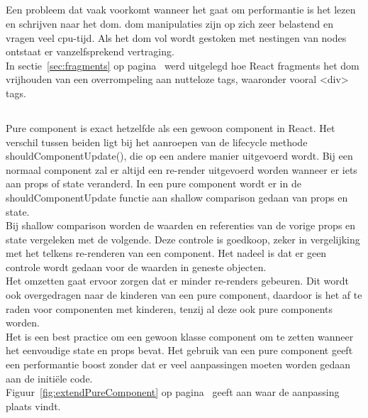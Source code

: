 \subsection{}
\label{sec:fragmentsPraktisch}

Een probleem dat vaak voorkomt wanneer het gaat om performantie is het lezen en schrijven naar het \gls{dom}. \gls{dom} manipulaties zijn op zich zeer belastend en vragen veel \gls{cpu}-tijd. Als het \gls{dom} vol wordt gestoken met nestingen van nodes ontstaat er vanzelfsprekend vertraging.\\
In sectie~\ref{sec:fragments} op pagina~\pageref{sec:fragments} werd uitgelegd hoe React fragments het \gls{dom} vrijhouden van een overrompeling aan nutteloze tags, waaronder vooral <div> tags.

\subsection{}
\label{sec:pureComponent}

Pure component is exact hetzelfde als een gewoon component in React. Het verschil tussen beiden ligt bij het aanroepen van de lifecycle methode shouldComponentUpdate(), die op een andere manier uitgevoerd wordt. Bij een normaal component zal er altijd een re-render uitgevoerd worden wanneer er iets aan props of state veranderd. In een pure component wordt er in de shouldComponentUpdate functie aan shallow comparison gedaan van props en state.\\
Bij shallow comparison worden de waarden en referenties van de vorige props en state vergeleken met de volgende. Deze controle is goedkoop, zeker in vergelijking met het telkens re-renderen van een component. Het nadeel is dat er geen controle wordt gedaan voor de waarden in geneste objecten. \\
Het omzetten gaat ervoor zorgen dat er minder re-renders gebeuren. Dit wordt ook overgedragen naar de kinderen van een pure component, daardoor is het af te raden voor componenten met kinderen, tenzij al deze ook pure components worden.\\
Het is een best practice om een gewoon klasse component om te zetten wanneer het eenvoudige state en props bevat. Het gebruik van een pure component geeft een performantie boost zonder dat er veel aanpassingen moeten worden gedaan aan de initiële code.\\
Figuur~\ref{fig:extendPureComponent} op pagina~\pageref{fig:extendPureComponent} geeft aan waar de aanpassing plaats vindt.

